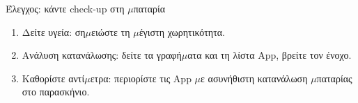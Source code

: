 \begin{tcbpractice}{Έλεγχος: κάντε check-up στη $\mu$παταρία}
\begin{enumerate}
  \item Δείτε υγεία: ση$\mu$ειώστε τη $\mu$έγιστη χωρητικότητα.
  \item Ανάλυση κατανάλωσης: δείτε τα γραφή$\mu$ατα και τη λίστα App, βρείτε τον ένοχο.
  \item Καθορίστε αντί$\mu$ετρα: περιορίστε τις App $\mu$ε ασυνήθιστη κατανάλωση $\mu$παταρίας στο παρασκήνιο.
\end{enumerate}

\end{tcbpractice}

